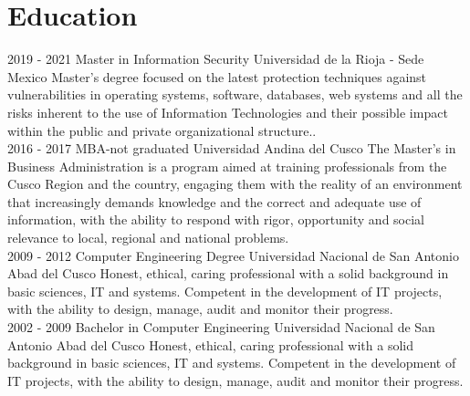 \documentclass[]{friggeri-cv}
\begin{document}
\section{Education}
\begin{entrylist}
    \entry
    {2019 - 2021}
    {Master in Information Security}
    {Universidad de la Rioja - Sede Mexico}
    {Master's degree focused on the latest protection techniques against vulnerabilities 
     in operating systems, software, databases, web systems and all the risks inherent 
     to the use of Information Technologies and their possible impact within the public 
     and private organizational structure..\\}
    \entry
    {2016 - 2017}
    {MBA-not graduated}
    {Universidad Andina del Cusco}
    {The Master's in Business Administration is a program aimed at training professionals 
	from the Cusco Region and the country, engaging them with the reality of an environment 
	that increasingly demands knowledge and the correct and adequate use of information, 
	with the ability to respond with rigor, opportunity and social relevance to local, 
	regional and national problems.\\}
    \entry
    {2009 - 2012}
    {Computer Engineering Degree}
    {Universidad Nacional de San Antonio Abad del Cusco}
    {Honest, ethical, caring professional with a solid background in basic sciences, IT and 
	systems. Competent in the development of IT projects, with the ability to design, 
	manage, audit and monitor their progress.\\}
    \entry
    {2002 - 2009}
    {Bachelor in Computer Engineering}
    {Universidad Nacional de San Antonio Abad del Cusco}
    {Honest, ethical, caring professional with a solid background in basic sciences, IT and 
	systems. Competent in the development of IT projects, with the ability to design, 
	manage, audit and monitor their progress.}
\end{entrylist}
\\
\end{document}
